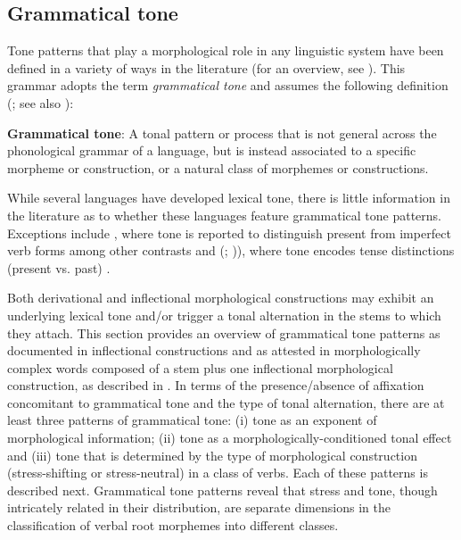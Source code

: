 \subsection{Grammatical tone}
\label{subsec: grammatical tone}

Tone patterns that play a morphological role in any linguistic system have been defined in a variety of ways in the literature (for an overview, see \citealt{hyman2016morphological}). This grammar adopts the term \textit{grammatical tone} and assumes the following definition (\citealt{rolle2018grammatical}; see also \citealt{caballero2021grammatical}):

\ea\label{ex: grammatical tone definition}
{\textbf{Grammatical tone}: A tonal pattern or process that is not general across the phonological grammar of a language, but is instead associated to a specific morpheme or construction, or a natural class of morphemes or constructions.}
\z

While several  languages have developed lexical tone, there is little information in the literature as to whether these languages feature grammatical tone patterns. Exceptions include , where tone is reported to distinguish present from imperfect verb forms among other contrasts \parencite{whorf1993pitch} and  (; )), where tone encodes tense distinctions (present vs. past) \parencite{banerji2014huichol}.

Both derivational and inflectional morphological constructions may exhibit an underlying lexical tone and/or trigger a tonal alternation in the stems to which they attach. This section provides an overview of grammatical tone patterns as documented in inflectional constructions and as attested in morphologically complex words composed of a stem plus one inflectional morphological construction, as described in \citet{caballero2021grammatical}. In terms of the presence/absence of affixation concomitant to grammatical tone and the type of tonal alternation, there are at least three patterns of grammatical tone: (i) tone as an exponent of morphological information; (ii) tone as a morphologically-conditioned tonal effect and (iii) tone that is determined by the type of morphological construction (stress-shifting or stress-neutral) in a class of verbs. Each of these patterns is described next. Grammatical tone patterns reveal that stress and tone, though intricately related in their distribution, are separate dimensions in the classification of verbal root morphemes into different classes.

